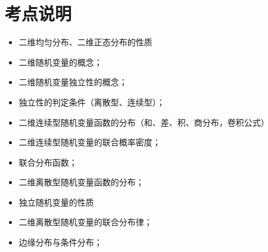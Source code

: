 \section{考点说明}
\begin{itemize}
\item 二维均匀分布、二维正态分布的性质
\item 二维随机变量的概念；
\item 二维随机变量独立性的概念；
\item 独立性的判定条件（离散型、连续型）；
\item 二维连续型随机变量函数的分布（和、差、积、商分布，卷积公式）
\item 二维连续型随机变量的联合概率密度；
\item 联合分布函数；
\item 二维离散型随机变量函数的分布；
\item 独立随机变量的性质
\item 二维离散型随机变量的联合分布律；
\item 边缘分布与条件分布；
\end{itemize}

